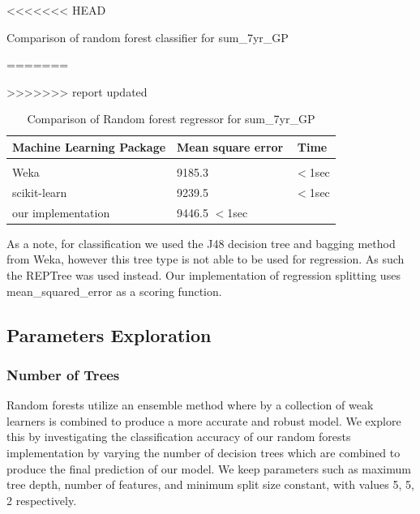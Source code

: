 \documentclass{article} %
\begin{document}
\begin{table}[h]
<<<<<<< HEAD
\caption{Comparison of random forest classifier for sum\_7yr\_GP}
=======
\caption{Comparison of Random forest regressor for sum\_7yr\_GP}
>>>>>>> report updated
\label{reg-table}
\begin{center}
\begin{tabular}{lll}
\multicolumn{1}{c}{\bf Machine Learning Package} &\multicolumn{1}{c}{\bf Mean square error} &\multicolumn{1}{c}{\bf Time}
\\ \hline \\
Weka         &9185.3	&$<$1sec \\
scikit-learn             &9239.5	&$<$1sec \\
our implementation             &9446.5	$<$1sec \\
\end{tabular}
\end{center}
\end{table}

As a note, for classification we used the J48 decision tree and bagging method from Weka, however this tree type is not able to be used for regression. As such the REPTree was used instead. Our implementation of regression splitting uses mean_squared_error as a scoring function.\cite{Brieman84} 
\subsection{Parameters Exploration}

\subsubsection{Number of Trees}

Random forests utilize an ensemble method where by a collection of weak learners is combined to produce a more accurate and robust model. We explore this by investigating the classification accuracy of our random forests implementation by varying the number of decision trees which are combined to produce the final prediction of our model. We keep parameters such as maximum tree depth, number of features, and minimum split size constant, with values 5, 5, 2 respectively.
\end{document}
